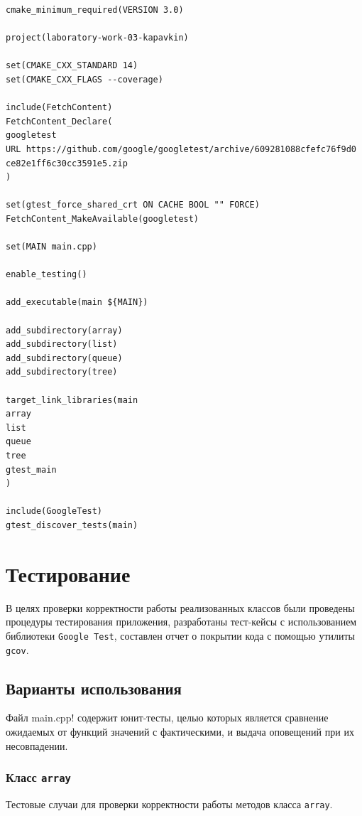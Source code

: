 \documentclass[a4paper,12pt]{article}
\begin{document}
\begin{lstlisting}[caption={Файл сборки CMakeLists.txt},label=CMakeLists]
cmake_minimum_required(VERSION 3.0)

project(laboratory-work-03-kapavkin)

set(CMAKE_CXX_STANDARD 14)
set(CMAKE_CXX_FLAGS --coverage)

include(FetchContent)
FetchContent_Declare(
googletest
URL https://github.com/google/googletest/archive/609281088cfefc76f9d0
ce82e1ff6c30cc3591e5.zip
)

set(gtest_force_shared_crt ON CACHE BOOL "" FORCE)
FetchContent_MakeAvailable(googletest)

set(MAIN main.cpp)

enable_testing()

add_executable(main ${MAIN})

add_subdirectory(array)
add_subdirectory(list)
add_subdirectory(queue)
add_subdirectory(tree)

target_link_libraries(main
array
list
queue
tree
gtest_main
)

include(GoogleTest)
gtest_discover_tests(main)
\end{lstlisting}

\cleardoublepage

\section{Тестирование}

В целях проверки корректности работы реализованных классов были проведены процедуры тестирования приложения, разработаны тест-кейсы с использованием библиотеки \verb!Google Test!, составлен отчет о покрытии кода с помощью утилиты \verb!gcov!.

\subsection{Варианты использования}

Файл main.cpp! содержит юнит-тесты, целью которых является сравнение ожидаемых от функций значений с фактическими, и выдача оповещений при их несовпадении.

\subsubsection{Класс {\tt array}}

Тестовые случаи для проверки корректности работы методов класса {\tt array}.
\end{document}
